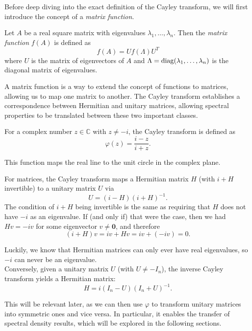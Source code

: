 Before deep diving into the exact definition of the Cayley transform,
we will first introduce the concept of a \emph{matrix function}.

\begin{definition}
    Let $A$ be a real square matrix with eigenvalues $\lambda_1, \ldots, \lambda_n$.
    Then the \emph{matrix function} $f(A)$ is defined as
    \[
    f(A) = U f(\Lambda) U^T
    \]
    where $U$ is the matrix of eigenvectors of $A$ and $\Lambda = \operatorname{diag}(\lambda_1, \ldots, \lambda_n)$ is the diagonal matrix of eigenvalues.
\end{definition}

A matrix function is a way to extend the concept of functions to matrices,
allowing us to map one matrix to another.
The Cayley transform establishes a correspondence between Hermitian and unitary matrices,
allowing spectral properties to be translated between these two important classes.

For a complex number $z \in \mathbb{C}$ with $z \neq -i$, the Cayley transform is defined as
\[
\varphi(z) = \frac{i - z}{i + z}.
\]

This function maps the real line to the unit circle in the complex plane.

\vspace{0.5cm}



For matrices, the Cayley transform maps a Hermitian matrix $H$ (with $i + H$ invertible) to a unitary matrix $U$ via
\[
U = (i - H)(i + H)^{-1}.
\]
The condition of $i + H$ being invertible is the same as requiring that $H$ does not have $-i$ as an eigenvalue.
If (and only if) that were the case, then we had $H v = -i v$ for some eigenvector $v \neq \mathbf{0}$,
and therefore 
\[
(i + H) v = i v + H v = i v + (-i v) = 0.
\]

Luckily, we know that Hermitian matrices can only ever have real eigenvalues, so $-i$ can never be an eigenvalue.\\

Conversely, given a unitary matrix $U$ (with $U \neq -I_n$),
the inverse Cayley transform yields a Hermitian matrix:
\[
H = i (I_n - U)(I_n + U)^{-1}.
\]

This will be relevant later, as we can then use $\varphi$ to transform unitary matrices into symmetric ones and vice versa.
In particular, it enables the transfer of spectral density results,
which will be explored in the following sections.


